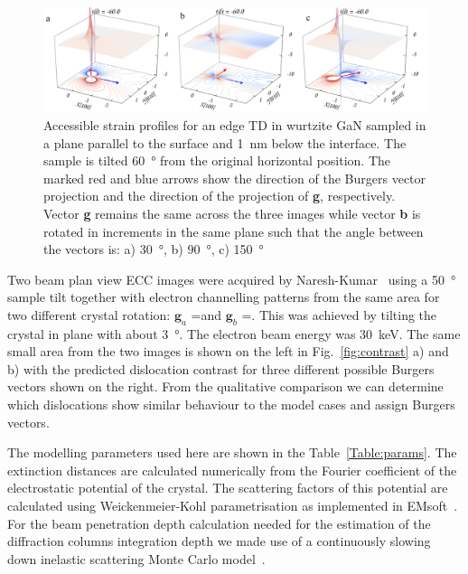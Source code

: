 \begin{figure}[ht]
    \centering
    \includegraphics[width=1.1\linewidth]{Figures/rotateEdge.png}
    \caption[Edge TD ECC-strain in different orientations.]{Accessible strain profiles for an edge TD in wurtzite GaN sampled in a plane parallel  to the surface and \SI{1}{\nano \meter} below the interface. The sample is tilted  \SI{60}{\degree} from the original horizontal position. The marked red and blue arrows show the direction of the Burgers vector projection and the direction of the projection of \textbf{g}, respectively. Vector\textbf{ g} remains the same across the three images while vector \textbf{b} is rotated in  increments in the same plane such that the angle between the vectors is: a) \SI{30}{\degree}, b) \SI{90}{\degree}, c) \SI{150}{\degree} }
    \label{fig:rotateEdge}
\end{figure}



Two beam plan view ECC images were acquired by Naresh-Kumar~\cite{Naresh} using a \SI{50}{\degree}  sample tilt together with electron channelling patterns from the same area for two different crystal rotation: $\mathbf{g}_a$ =\hkl[-5-7-3] and $\mathbf{g}_b$ =\hkl[75-3]. This was achieved by tilting the crystal in plane with about \SI{3}{\degree}. The electron beam energy was \SI{30}{\kilo \electronvolt}. The same small area from the two images is shown on the left in Fig.~\ref{fig:contrast} a) and b) with the predicted dislocation contrast for three different possible Burgers vectors shown on the right. From the qualitative comparison we can determine which dislocations show similar behaviour to the model cases and assign Burgers vectors.

The modelling parameters used here are shown in the Table~\ref{Table:params}. The extinction distances are calculated numerically from the Fourier coefficient of the electrostatic potential of the crystal. The scattering factors of this potential are calculated using Weickenmeier-Kohl parametrisation as implemented in EMsoft~\cite{EMsoft}. For the beam penetration depth calculation needed for the estimation of the diffraction columns integration depth we made use of a continuously slowing down inelastic scattering Monte Carlo model~\cite{casino}. 






